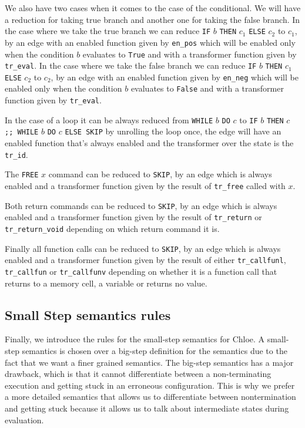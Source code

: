 We also have two cases when it comes to the case of the conditional.
We will have a reduction for taking true branch and another one for taking the false branch.
In the case where we take the true branch we can reduce \verb|IF| $b$ \verb|THEN| $c_{1}$ \verb|ELSE| $c_{2}$ to $c_{1}$, by an edge with an enabled function given by \verb|en_pos| which will be enabled only when the condition $b$ evaluates to \verb|True| and with a transformer function given by \verb|tr_eval|.
In the case where we take the false branch we can reduce \verb|IF| $b$ \verb|THEN| $c_{1}$ \verb|ELSE| $c_{2}$ to $c_{2}$, by an edge with an enabled function given by \verb|en_neg| which will be enabled only when the condition $b$ evaluates to \verb|False| and with a transformer function given by \verb|tr_eval|.

In the case of a loop it can be always reduced from \verb|WHILE| $b$ \verb|DO| $c$ to \verb|IF| $b$ \verb|THEN| $c$ \verb|;; WHILE| $b$ \verb|DO| $c$ \verb|ELSE SKIP| by unrolling the loop once, the edge will have an enabled function that's always enabled and the transformer over the state is the \verb|tr_id|.

The \verb|FREE| $x$ command can be reduced to \verb|SKIP|, by an edge which is always enabled and a transformer function given by the result of \verb|tr_free| called with $x$.

Both return commands can be reduced to \verb|SKIP|, by an edge which is always enabled and a transformer function given by the result of \verb|tr_return| or \verb|tr_return_void| depending on which return command it is.

Finally all function calls can be reduced to \verb|SKIP|, by an edge which is always enabled and a transformer function given by the result of either \verb|tr_callfunl|, \verb|tr_callfun| or \verb|tr_callfunv| depending on whether it is a function call that returns to a memory cell, a variable or returns no value.

\subsection{Small Step semantics rules}\label{subsection:rules_small_step}

Finally, we introduce the rules for the small-step semantics for Chloe.
A small-step semantics is chosen over a big-step definition for the semantics due to the fact that we want a finer grained semantics.
The big-step semantics has a major drawback, which is that it cannot differentiate between a non-terminating execution and getting stuck in an erroneous configuration.
This is why we prefer a more detailed semantics that allows us to differentiate between nontermination and getting stuck because it allows us to talk about intermediate states during evaluation.

